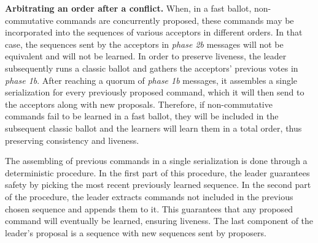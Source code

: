 \noindent\textbf{Arbitrating an order after a conflict.} When, in a fast ballot, non-commutative commands are  concurrently proposed, these commands may be incorporated into the sequences of various acceptors in different orders. In that case, the sequences sent by the acceptors in \textit{phase 2b} messages will not be equivalent and will not be learned. In order to preserve liveness, the leader subsequently runs a classic ballot and gathers the acceptors' previous votes in \textit{phase 1b}. After reaching a quorum of \textit{phase 1b} messages, it assembles a single serialization for every previously proposed command, which it will then send to the acceptors along with new proposals. Therefore, if non-commutative commands fail to be learned in a fast ballot, they will be included in the subsequent classic ballot and the learners will learn them in a total order, thus preserving consistency and liveness. \par 
The assembling of previous commands in a single serialization is done through a deterministic procedure. In the first part of this procedure, the leader guarantees safety by picking the most recent previously learned sequence. In the second part of the procedure, the leader extracts commands not included in the previous chosen sequence and appends them to it. This guarantees that any proposed command will eventually be learned, ensuring liveness. The last component of the leader's proposal is a sequence with new sequences sent by proposers. 

